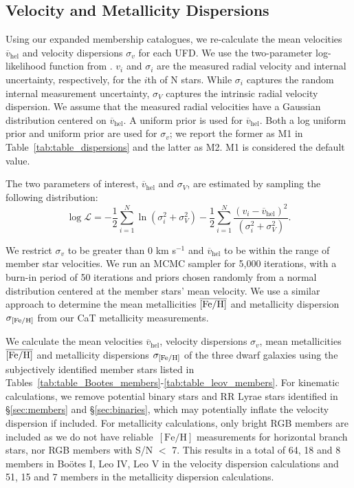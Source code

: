\documentclass[twocolumn]{aastex63}
\newcommand{\unit}[1]{\ensuremath{\mathrm{\,#1}}\xspace}
\newcommand{\feh}{\unit{[Fe/H]}}
\begin{document}
\subsection{Velocity and Metallicity Dispersions} 
\label{sec:dispersions}
Using our expanded membership catalogues, we re-calculate the mean velocities $\overline{v}_\mathrm{hel}$ and velocity dispersions $\sigma_v$ for each UFD. We use the two-parameter log-likelihood function from \citet{wal2009}. $v_i$ and $\sigma_i$ are the measured radial velocity and internal uncertainty, respectively, for the $i$th of N stars. While $\sigma_i$ captures the random internal measurement uncertainty, $\sigma_V$ captures the intrinsic radial velocity dispersion. We assume that the measured radial velocities have a Gaussian distribution centered on $\overline{v}_\mathrm{hel}$. A uniform prior is used for $\overline{v}_\mathrm{hel}$. Both a log uniform prior and uniform prior are used for $\sigma_v$; we report the former as M1 in Table~\ref{tab:table_dispersions} and the latter as M2. M1 is considered the default value.

The two parameters of interest, $\overline{v}_\mathrm{hel}$ and $\sigma_V$, are estimated by sampling the following distribution: 
\begin{equation}\label{eq:dispersion_eq}
\log \mathcal{L}=-\frac{1}{2}\sum_{i=1}^{N}\ln(\sigma_i^2+\sigma_V^2)-\frac{1}{2}\sum_{i=1}^N\frac{(v_i-\overline{v}_\mathrm{hel})^2}{(\sigma_i^2+\sigma_V^2)}.
\end{equation}

We restrict $\sigma_v$ to be greater than 0 km s$^{-1}$ and $\overline{v}_\mathrm{hel}$ to be within the range of member star velocities. We run an MCMC sampler for 5,000 iterations, with a burn-in period of 50 iterations and priors chosen randomly from a normal distribution centered at the member stars' mean velocity. We use a similar approach to determine the mean metallicities $\overline{\rm[Fe/H]}$ and metallicity dispersion $\sigma_{\rm[Fe/H]}$ from our CaT metallicity measurements. 

We calculate the mean velocities $\overline{v}_\mathrm{hel}$, velocity dispersions $\sigma_v$, mean metallicities $\overline{\rm[Fe/H]}$ and metallicity dispersions $\sigma_{\rm[Fe/H]}$ of the three dwarf galaxies using the subjectively identified member stars listed in Tables~\ref{tab:table_Bootes_members}-\ref{tab:table_leov_members}. For kinematic calculations, we remove potential binary stars and RR Lyrae stars identified in \S\ref{sec:members} and \S\ref{sec:binaries}, which may potentially inflate the velocity dispersion if included. For metallicity calculations, only bright RGB members are included as we do not have reliable \feh measurements for horizontal branch stars, nor RGB members with S/N $<$ 7.
This results in a total of 64, 18 and 8 members in Bo{\"o}tes I, Leo IV, Leo V in the velocity dispersion calculations and 51, 15 and 7 members in the metallicity dispersion calculations. 
\end{document}
